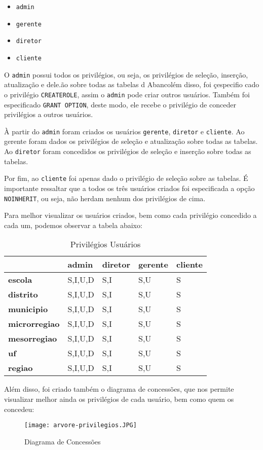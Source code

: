 \documentclass[12pt,a4paper]{article}
\begin{document}
\begin{itemize}
    \item \texttt{admin}
    \item \texttt{gerente}
    \item \texttt{diretor}
    \item \texttt{cliente}
\end{itemize}

O \texttt{admin} possui todos os privilégios, ou seja, os privilégios de seleção, inserção, atualização e dele.ão sobre todas as tabelas d Abancolém disso, foi çespecifio cado o privilégio \texttt{CREATEROLE}, assim o \texttt{admin} pode criar outros usuários. Também foi especificado \texttt{GRANT OPTION}, deste modo, ele recebe o privilégio de conceder privilégios a outros usuários.

À partir do \texttt{admin} foram criados os usuários \texttt{gerente}, \texttt{diretor} e \texttt{cliente}. Ao gerente foram dados os privilégios de seleção e atualização sobre todas as tabelas. Ao \texttt{diretor} foram concedidos os privilégios de seleção e inserção sobre todas as tabelas.

Por fim, ao \texttt{cliente} foi apenas dado o privilégio de seleção sobre as tabelas. É importante ressaltar que a todos os três usuários criados foi especificada a opção \texttt{NOINHERIT}, ou seja, não herdam nenhum dos privilégios de cima.

Para melhor visualizar os usuários criados, bem como cada privilégio concedido a cada um, podemos observar a tabela abaixo:

\begin{table}[htbp]
  \centering
  \caption{Privilégios Usuários}
    \begin{tabular}{|l|l|l|l|l|}
    \toprule
    \hline
          & \textbf{admin} & \textbf{diretor} & \textbf{gerente} & \textbf{cliente} \\
    \midrule
    \hline
    \textbf{escola} & S,I,U,D & S,I   & S,U   & S \\
    \midrule
    \textbf{distrito} & S,I,U,D & S,I   & S,U   & S \\
    \midrule
    \textbf{municipio} & S,I,U,D & S,I   & S,U   & S \\
    \midrule
    \textbf{microrregiao} & S,I,U,D & S,I   & S,U   & S \\
    \midrule
    \textbf{mesorregiao} & S,I,U,D & S,I   & S,U   & S \\
    \midrule
    \textbf{uf} & S,I,U,D & S,I   & S,U   & S \\
    \midrule
    \textbf{regiao} & S,I,U,D & S,I   & S,U   & S \\
    \bottomrule
    \hline
    \end{tabular}%
  \label{tab:addlabel}%
\end{table}%

Além disso, foi criado também o diagrama de concessões, que nos permite visualizar melhor ainda os privilégios de cada usuário, bem como quem os concedeu:

\begin{figure}[H]
    \centering
    \texttt{[image: arvore-privilegios.JPG]}
    \caption{Diagrama de Concessões}
    \label{fig:diagrama}
\end{figure}
\end{document}
